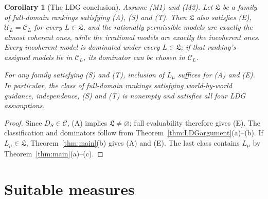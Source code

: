 \documentclass[11pt]{article}
\newtheorem{corollary}[theorem]{Corollary}
\theoremstyle{definition}
\newcommand{\C}{\mathcal C}
\newcommand{\U}{\mathcal U}
\newcommand{\Lf}{\mathfrak L}
\newcommand{\Lmu}{L_\mu}
\begin{document}
\begin{corollary}[The LDG conclusion]\label{cor:argument}
Assume (M1) and (M2). Let $\Lf$ be a family of full-domain rankings satisfying (A), {\color{red}(S)} and {\color{red}(T)}. Then $\Lf$ also satisfies (E), $\U_L=\C_L$ for every $L\in\Lf$, and the rationally permissible models are exactly the almost coherent ones, while the irrational models are exactly the incoherent ones. Every incoherent model is dominated under every $L\in\Lf$; {\color{red}if that ranking's assigned models lie in $\C_L$, its dominator can be chosen in $\C_L$.}

For any family satisfying {\color{red}(S)} and {\color{red}(T)}, inclusion of $\Lmu$ suffices for (A) and (E). In particular, the class of full-domain rankings satisfying world-by-world guidance, independence, {\color{red}(S)} and {\color{red}(T)} is nonempty and satisfies all four LDG assumptions.
\end{corollary}
\begin{proof}
Since $D_S\in\C$, (A) implies $\Lf\ne\varnothing$; full evaluability therefore gives (E). The classification and dominators follow from Theorem~\ref{thm:LDGargument}(a)--(b). If $\Lmu\in\Lf$, Theorem~\ref{thm:main}(b) gives (A) and (E). The last class contains $\Lmu$ by Theorem~\ref{thm:main}(a)--(c).
\end{proof}

\section{Suitable measures}\label{sec:measures}
\end{document}
